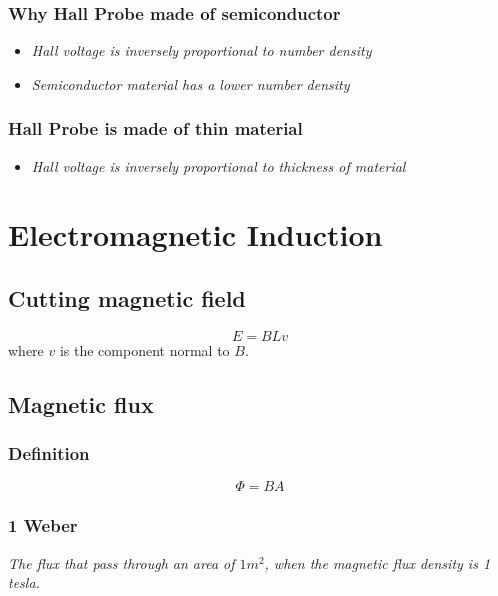 \documentclass[a4paper,9pt]{scrartcl}
\begin{document}
    \subsubsection{Why Hall Probe made of semiconductor}
    \begin{itemize}
        \item \textit{Hall voltage is inversely proportional to number density}
        \item \textit{Semiconductor material has a lower number density}
    \end{itemize}

    \subsubsection{Hall Probe is made of thin material}
    \begin{itemize}
        \item \textit{Hall voltage is inversely proportional to thickness of material}
    \end{itemize}


    \section{Electromagnetic Induction}

    \subsection{Cutting magnetic field}
    \begin{displaymath}
        E = BLv
    \end{displaymath}
    where $v$ is the component normal to $B$.

    \subsection{Magnetic flux}

    \subsubsection{Definition}
    \begin{displaymath}
        \Phi = BA
    \end{displaymath}

    \subsubsection{1 Weber}
    \textit{The flux that pass through an area of $1m^2$, when the magnetic flux density is 1 tesla.}
\end{document}

